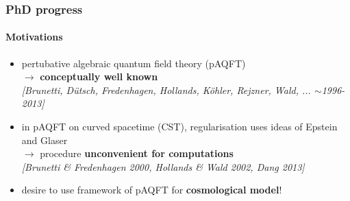 \documentclass[9pt]{beamer}
\newcommand{\citebeam}[1]{\textit{\textcolor{black!60!white}{[#1]}}} %
\begin{document}
\begin{frame}

\frametitle{PhD progress}
\framesubtitle{Motivations}

\begin{itemize}
    
\item pertubative algebraic quantum field theory (pAQFT) \\
$\to$ \textbf{conceptually well known} \\
\citebeam{Brunetti, Dütsch, Fredenhagen, Hollands, K\"ohler, Rejzner, Wald, ... $\sim$1996-2013} \\
    
\item in pAQFT on curved spacetime (CST), regularisation uses ideas of Epstein and Glaser \\
$\to$ procedure \textbf{unconvenient for computations} \\
\citebeam{Brunetti \& Fredenhagen 2000, Hollands \& Wald 2002, Dang 2013} \\
    
\item desire to use framework of pAQFT for \textbf{cosmological model}! \\
 
\end{itemize}

\end{frame}

\end{document}

